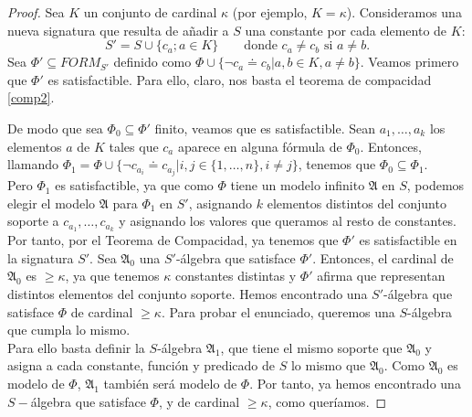 \begin{proof}
Sea $K$ un conjunto de cardinal $\kappa$ (por ejemplo, $K=\kappa$). Consideramos una nueva signatura que resulta de añadir a $S$ una constante por cada elemento de $K$:
\[S'=S\cup\{c_a;a\in K\}\qquad\text{donde $c_a\neq c_b$ si $a\neq b$.}\]
Sea $\Phi'\subseteq FORM_{S'}$ definido como $\Phi\cup\{\neg c_a\doteq c_b|a,b\in K,a\neq b\}$. Veamos primero que $\Phi'$ es satisfactible. Para ello, claro, nos basta el teorema de compacidad \ref{comp2}.

De modo que sea $\Phi_0\subseteq\Phi'$ finito, veamos que es satisfactible. Sean $a_1,\dots,a_k$ los elementos $a$ de $K$ tales que $c_a$ aparece en alguna fórmula de $\Phi_0$. Entonces, llamando $\Phi_1=\Phi\cup\{\neg c_{a_i}\doteq c_{a_j}|i,j\in\{1,\dots,n\},i\neq j\}$, tenemos que $\Phi_0\subseteq\Phi_1$.\\

Pero $\Phi_1$ es satisfactible, ya que como $\Phi$ tiene un modelo infinito $\mathfrak{A}$ en $S$, podemos elegir el modelo $\mathfrak{A}$ para $\Phi_1$ en $S'$, asignando $k$ elementos distintos del conjunto soporte a $c_{a_1},\dots,c_{a_k}$ y asignando los valores que queramos al resto de constantes.\\

Por tanto, por el Teorema de Compacidad, ya tenemos que $\Phi'$ es satisfactible en la signatura $S'$. Sea $\mathfrak{A}_0$ una $S'$-álgebra que satisface $\Phi'$. Entonces, el cardinal de $\mathfrak{A}_0$ es $\geq\kappa$, ya que tenemos $\kappa$ constantes distintas y $\Phi'$ afirma que representan distintos elementos del conjunto soporte. Hemos encontrado una $S'$-álgebra que satisface $\Phi$ de cardinal $\geq\kappa$. Para probar el enunciado, queremos una $S$-álgebra que cumpla lo mismo.\\

Para ello basta definir la $S$-álgebra $\mathfrak{A}_1$, que tiene el mismo soporte que $\mathfrak{A}_0$ y asigna a cada constante, función y predicado de $S$ lo mismo que $\mathfrak{A}_0$. Como $\mathfrak{A}_0$ es modelo de $\Phi$, $\mathfrak{A}_1$ también será modelo de $\Phi$. Por tanto, ya hemos encontrado una $S-$álgebra que satisface $\Phi$, y de cardinal $\geq\kappa$, como queríamos.
\end{proof}

